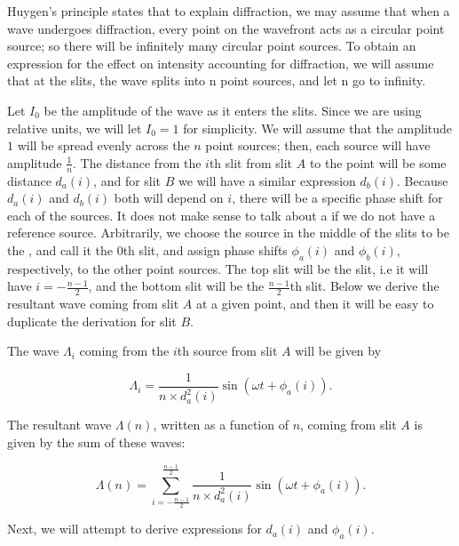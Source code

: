 \documentclass{paper}
\begin{document}
Huygen’s principle \parencite{huygens-principle} states that to explain diffraction, we may assume that when a wave undergoes diffraction, every point on the wavefront
acts as a circular point source; so there will be infinitely many circular point
sources. To obtain an expression for the effect on intensity accounting for diffraction, we will assume that at the slits, the wave splits into n point sources, and let n go
to infinity.

Let $I_0$ be the amplitude of the wave as it enters the slits. Since we are using relative units, we will let $I_0 = 1$ for simplicity. We will assume that the amplitude $1$ will be spread evenly across the $n$ point sources; then, each source will have amplitude $\frac{1}{n}$. The distance from the $i$th slit from slit $A$ to the point will be some distance $d_a(i)$, and for slit $B$ we will have a similar expression $d_b(i)$. Because $d_a(i)$ and $d_b(i)$ both will depend on $i$, there will be a specific phase shift for each of the sources. It does not make sense to talk about a  if we do not have a reference source. Arbitrarily, we choose the source in the middle of the slits to be the , and call it the $0$th slit, and assign phase shifts $\phi_a(i)$ and $\phi_b(i)$, respectively, to the other point sources. The top slit will be the  slit, i.e it will have $i = -\frac{n - 1}{2}$, and the bottom slit will be the $\frac{n - 1}{2}$th slit. Below we derive the resultant wave coming from slit $A$ at a given point, and then it will be easy to duplicate the derivation for slit $B$.

The wave $\Lambda_i$ coming from the $i$th source from slit $A$ will be given by

\begin{equation*}
    \Lambda_i = \frac{1}{n \times d_a^2(i)}\sin(\omega t + \phi_a(i)).
\end{equation*}

The resultant wave $\Lambda(n)$, written as a function of $n$, coming from slit $A$ is given by the sum of these waves:

\begin{equation}
    \label{eq:sum-of-sine-waves}
    \Lambda(n) = \sum_{i = -\frac{n - 1}{2}}^{\frac{n - 1}{2}} \frac{1}{n \times d_a^2(i)} \sin(\omega t + \phi_a(i)).
\end{equation}


Next, we will attempt to derive expressions for $d_a(i)$ and $\phi_a(i)$.
\end{document}
